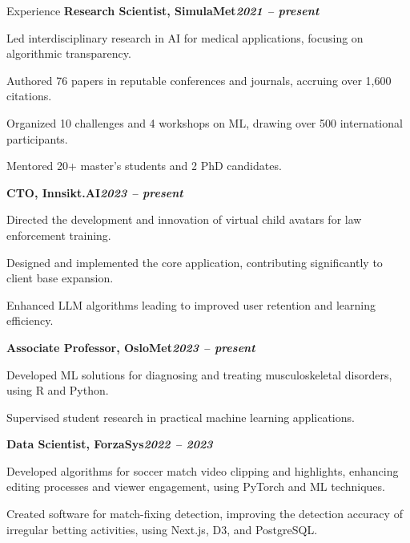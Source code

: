 \begin{rubric}{Experience}
%
\entry*[]%
\textbf{Research Scientist, SimulaMet\hfill\textit{2021 -- present}} \par
\begin{compactitem}
\item Led interdisciplinary research in AI for medical applications, focusing on algorithmic transparency.
\item Authored 76 papers in reputable conferences and journals, accruing over 1,600 citations.
\item Organized 10 challenges and 4 workshops on ML, drawing over 500 international participants.
\item Mentored 20+ master's students and 2 PhD candidates.
\vspace{-12pt}
\end{compactitem}
%
\entry*[]%
\textbf{CTO, Innsikt.AI\hfill\textit{2023 -- present}} \par
\begin{compactitem}
\item Directed the development and innovation of virtual child avatars for law enforcement training.
\item Designed and implemented the core application, contributing significantly to client base expansion.
\item Enhanced LLM algorithms leading to improved user retention and learning efficiency.
\vspace{-12pt}
\end{compactitem}
%
\entry*[]%
\textbf{Associate Professor, OsloMet\hfill\textit{2023 -- present}} \par
\begin{compactitem}
\item Developed ML solutions for diagnosing and treating musculoskeletal disorders, using R and Python.
\item Supervised student research in practical machine learning applications.
\vspace{-12pt}
\end{compactitem}
%
\entry*[]%
\textbf{Data Scientist, ForzaSys\hfill\textit{2022 -- 2023}} \par
\begin{compactitem}
\item Developed algorithms for soccer match video clipping and highlights, enhancing editing processes and viewer engagement, using PyTorch and ML techniques.
\item Created software for match-fixing detection, improving the detection accuracy of irregular betting activities, using Next.js, D3, and PostgreSQL.

\end{compactitem}
\end{rubric}
